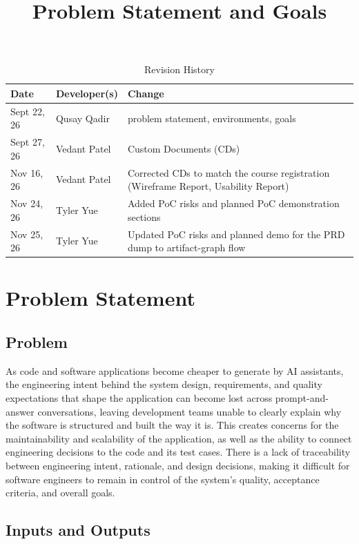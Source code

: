 \documentclass{article}
\title{Problem Statement and Goals\\\progname}
\author{\authname}
\date{}
\begin{document}
\maketitle

\begin{table}[hp]
\caption{Revision History} \label{TblRevisionHistory}
\begin{tabularx}{\textwidth}{llX}
\toprule
\textbf{Date} & \textbf{Developer(s)} & \textbf{Change}\\
\midrule
Sept 22, 26 & Qusay Qadir & problem statement, environments, goals\\
Sept 27, 26 & Vedant Patel & Custom Documents (CDs)\\
Nov 16, 26 & Vedant Patel & Corrected CDs to match the course registration (Wireframe Report, Usability Report)\\
Nov 24, 26 & Tyler Yue & Added PoC risks and planned PoC demonstration sections\\
Nov 25, 26 & Tyler Yue & Updated PoC risks and planned demo for the PRD dump to artifact-graph flow\\
\bottomrule
\end{tabularx}
\end{table}

\section{Problem Statement}

\subsection{Problem}

As code and software applications become cheaper to generate by AI assistants, 
the engineering intent behind the system design, requirements, and quality expectations 
that shape the application can become lost across prompt-and-answer conversations, 
leaving development teams unable to clearly explain why the software is structured and built the way it is. 
This creates concerns for the maintainability and scalability of the application, as well as the ability to 
connect engineering decisions to the code and its test cases. There is a lack of traceability between engineering 
intent, rationale, and design decisions, making it difficult for software engineers to remain in control of the 
system's quality, acceptance criteria, and overall goals.

\subsection{Inputs and Outputs}
\end{document}
